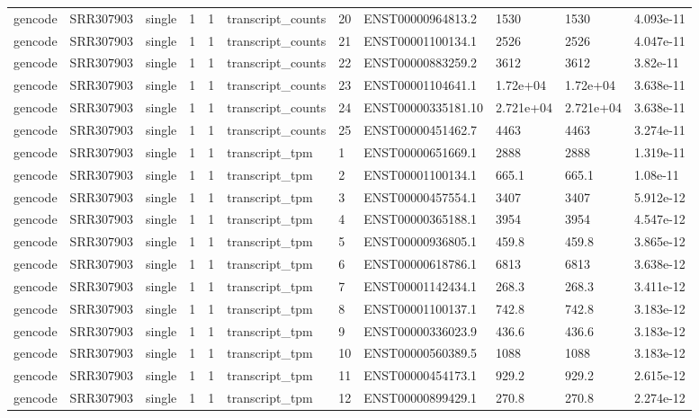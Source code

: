 \begin{tabular}{lllllllllll}
gencode & SRR307903 & single & 1 & 1 & transcript\_counts & 20 & ENST00000964813.2 & 1530 & 1530 & 4.093e-11 \\
gencode & SRR307903 & single & 1 & 1 & transcript\_counts & 21 & ENST00001100134.1 & 2526 & 2526 & 4.047e-11 \\
gencode & SRR307903 & single & 1 & 1 & transcript\_counts & 22 & ENST00000883259.2 & 3612 & 3612 & 3.82e-11 \\
gencode & SRR307903 & single & 1 & 1 & transcript\_counts & 23 & ENST00001104641.1 & 1.72e+04 & 1.72e+04 & 3.638e-11 \\
gencode & SRR307903 & single & 1 & 1 & transcript\_counts & 24 & ENST00000335181.10 & 2.721e+04 & 2.721e+04 & 3.638e-11 \\
gencode & SRR307903 & single & 1 & 1 & transcript\_counts & 25 & ENST00000451462.7 & 4463 & 4463 & 3.274e-11 \\
gencode & SRR307903 & single & 1 & 1 & transcript\_tpm & 1 & ENST00000651669.1 & 2888 & 2888 & 1.319e-11 \\
gencode & SRR307903 & single & 1 & 1 & transcript\_tpm & 2 & ENST00001100134.1 & 665.1 & 665.1 & 1.08e-11 \\
gencode & SRR307903 & single & 1 & 1 & transcript\_tpm & 3 & ENST00000457554.1 & 3407 & 3407 & 5.912e-12 \\
gencode & SRR307903 & single & 1 & 1 & transcript\_tpm & 4 & ENST00000365188.1 & 3954 & 3954 & 4.547e-12 \\
gencode & SRR307903 & single & 1 & 1 & transcript\_tpm & 5 & ENST00000936805.1 & 459.8 & 459.8 & 3.865e-12 \\
gencode & SRR307903 & single & 1 & 1 & transcript\_tpm & 6 & ENST00000618786.1 & 6813 & 6813 & 3.638e-12 \\
gencode & SRR307903 & single & 1 & 1 & transcript\_tpm & 7 & ENST00001142434.1 & 268.3 & 268.3 & 3.411e-12 \\
gencode & SRR307903 & single & 1 & 1 & transcript\_tpm & 8 & ENST00001100137.1 & 742.8 & 742.8 & 3.183e-12 \\
gencode & SRR307903 & single & 1 & 1 & transcript\_tpm & 9 & ENST00000336023.9 & 436.6 & 436.6 & 3.183e-12 \\
gencode & SRR307903 & single & 1 & 1 & transcript\_tpm & 10 & ENST00000560389.5 & 1088 & 1088 & 3.183e-12 \\
gencode & SRR307903 & single & 1 & 1 & transcript\_tpm & 11 & ENST00000454173.1 & 929.2 & 929.2 & 2.615e-12 \\
gencode & SRR307903 & single & 1 & 1 & transcript\_tpm & 12 & ENST00000899429.1 & 270.8 & 270.8 & 2.274e-12 \\

\end{tabular}
